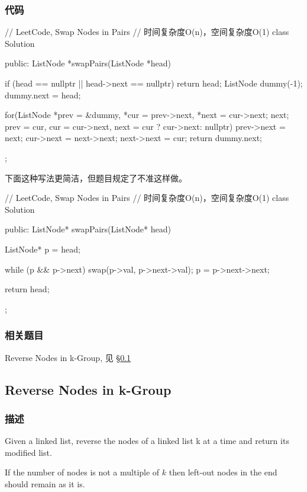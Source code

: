 \subsubsection{代码}
\begin{Code}
// LeetCode, Swap Nodes in Pairs
// 时间复杂度O(n)，空间复杂度O(1)
class Solution {
public:
    ListNode *swapPairs(ListNode *head) {
        if (head == nullptr || head->next == nullptr) return head;
        ListNode dummy(-1);
        dummy.next = head;

        for(ListNode *prev = &dummy, *cur = prev->next, *next = cur->next;
                next;
                prev = cur, cur = cur->next, next = cur ? cur->next: nullptr) {
            prev->next = next;
            cur->next = next->next;
            next->next = cur;
        }
        return dummy.next;
    }
};
\end{Code}

下面这种写法更简洁，但题目规定了不准这样做。
\begin{Code}
// LeetCode, Swap Nodes in Pairs
// 时间复杂度O(n)，空间复杂度O(1)
class Solution {
public:
    ListNode* swapPairs(ListNode* head) {
        ListNode* p = head;

        while (p && p->next) {
            swap(p->val, p->next->val);
            p = p->next->next;
        }

        return head;
    }
};
\end{Code}

\subsubsection{相关题目}

\begindot
\item Reverse Nodes in k-Group, 见 \S \ref{sec:reverse-nodes-in-k-group}
\myenddot


\subsection{Reverse Nodes in k-Group}
\label{sec:reverse-nodes-in-k-group}


\subsubsection{描述}
Given a linked list, reverse the nodes of a linked list k at a time and return its modified list.

If the number of nodes is not a multiple of $k$ then left-out nodes in the end should remain as it is.

